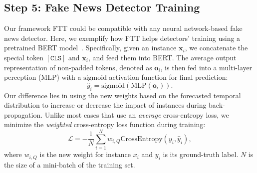 \documentclass[11pt]{article}
\begin{document}
\subsection{Step 5: Fake News Detector Training}
Our framework FTT could be compatible with any neural network-based fake news detector. Here, we exemplify how FTT helps detectors' training using a pretrained BERT model~\cite{bert}.
Specifically,  given an instance $\bm{x}_i$, we concatenate the special token $\mathtt{[CLS]}$ and $\bm{x}_i$, and feed them into BERT. 
The average output representation of non-padded tokens, denoted as $\bm{o}_i$, is then fed into a multi-layer perception ($\mathrm{MLP}$) with a $\mathrm{sigmoid}$ activation function for final prediction:
\begin{equation}
    \hat{y}_i = \mathrm{sigmoid}(\mathrm{MLP}(\bm{o}_i)).
\end{equation}
Our difference lies in using the new weights based on the forecasted temporal distribution to increase or decrease the impact of instances during back-propagation. Unlike most cases that use an \textit{average} cross-entropy loss, we minimize the \textit{weighted} cross-entropy loss function during training:
\begin{equation}
    \mathcal{L} = -\frac{1}{N}\sum_{i=1}^N w_{i,Q} \mathrm{CrossEntropy}(y_i,\hat{y}_i),
\end{equation}
where $w_{i,Q}$ is the new weight for instance $x_i$ and $y_i$ is its ground-truth label. $N$ is the size of a mini-batch of the training set.
\end{document}

